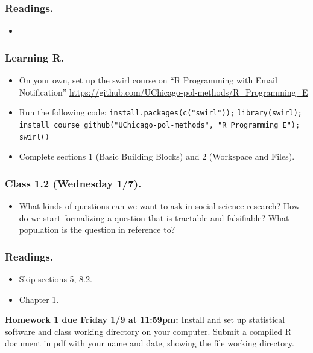 \documentclass[letterpaper, 12pt, parskip=full,DIV=10]{scrartcl}
\begin{document}
\subsubsection*{Readings.}
\begin{itemize}
\item {}
\end{itemize}

\subsubsection*{Learning R.}
\begin{itemize}
\item On your own, set up the swirl course on ``R Programming with Email Notification'' \url{https://github.com/UChicago-pol-methods/R_Programming_E}
\item Run the following code: \texttt{install.packages(c("swirl"));} 
\texttt{library(swirl); }
\texttt{install\_course\_github("UChicago-pol-methods", "R\_Programming\_E"); }
\texttt{swirl()}
\item Complete sections 1 (Basic Building Blocks) and 2 (Workspace and Files).
\end{itemize}

\subsubsection*{Class 1.2 (Wednesday 1/7).}
\begin{itemize}
\item What kinds of questions can we want to ask in social science research?
How do we start formalizing a question that is tractable and falsifiable?
What population is the question in reference to?
\end{itemize}

\subsubsection*{Readings.}
\begin{itemize}
\item {} Skip sections 5, 8.2.
\item {} Chapter 1.
\end{itemize}

\textbf{Homework 1 due Friday 1/9 at 11:59pm:}
Install and set up statistical software and class working directory on your computer.
Submit a compiled R document in pdf with your name and date, showing the file working directory.
\end{document}
